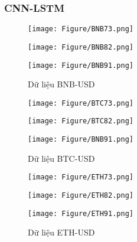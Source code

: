 \documentclass[conference]{IEEEtran}
\begin{document}
\subsubsection{CNN-LSTM}

\begin{figure}[H]
    \centering
    \begin{minipage}{0.15\textwidth}
    \centering
    \texttt{[image: Figure/BNB73.png]}
    \end{minipage}
    \hfill
    \begin{minipage}{0.15\textwidth}
    \centering
    \texttt{[image: Figure/BNB82.png]}
    \end{minipage}
    \hfill
    \begin{minipage}{0.15\textwidth}
    \centering
    \texttt{[image: Figure/BNB91.png]}
    \end{minipage}
    \caption{Dữ liệu BNB-USD}
    \label{fig:1}
\end{figure}

\begin{figure}[H]
    \centering
    \begin{minipage}{0.15\textwidth}
    \centering
    \texttt{[image: Figure/BTC73.png]}
    \end{minipage}
    \hfill
    \begin{minipage}{0.15\textwidth}
    \centering
    \texttt{[image: Figure/BTC82.png]}
    \end{minipage}
    \hfill
    \begin{minipage}{0.15\textwidth}
    \centering
    \texttt{[image: Figure/BNB91.png]}
    \end{minipage}
    \caption{Dữ liệu BTC-USD}
    \label{fig:1}
\end{figure}

\begin{figure}[H]
    \centering
    \begin{minipage}{0.15\textwidth}
    \centering
    \texttt{[image: Figure/ETH73.png]}
    \end{minipage}
    \hfill
    \begin{minipage}{0.15\textwidth}
    \centering
    \texttt{[image: Figure/ETH82.png]}
    \end{minipage}
    \hfill
    \begin{minipage}{0.15\textwidth}
    \centering
    \texttt{[image: Figure/ETH91.png]}
    \end{minipage}
    \caption{Dữ liệu ETH-USD}
    \label{fig:1}
\end{figure}
\end{document}
